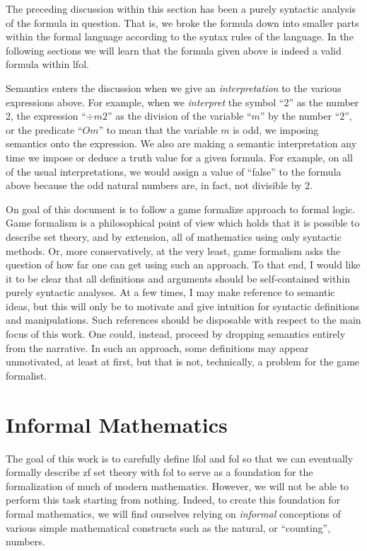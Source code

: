 \documentclass[12pt]{article}
\theoremstyle{break}
\theoremstyle{break}
\theoremstyle{break}
\theoremstyle{break}
\theoremstyle{break}
\newtheorem{informal definition}[definition]{Informal Definition}
\theoremstyle{break}
\newtheorem{informal theorem}[theorem]{Informal Theorem}
\newcommand{\qq}[1]{``#1''}
\begin{document}
	The preceding discussion within this section has been a purely syntactic analysis of the formula in question.
	That is, we broke the formula down into smaller parts within the formal language according to the syntax rules of the language.
	In the following sections we will learn that the formula given above is indeed a valid formula within \gls{lfol}.
	
	Semantics enters the discussion when we give an \textit{interpretation} to the various expressions above.
	For example, when we \textit{interpret} the symbol \qq{2} as the number 2, the expression \qq{$\div m 2$} as the division of the variable \qq{$m$} by the number \qq{2}, or the predicate \qq{$Om$} to mean that the variable $m$ is odd, we imposing semantics onto the expression.
	We also are making a semantic interpretation any time we impose or deduce a truth value for a given formula.
	For example, on all of the usual interpretations, we would assign a value of \qq{false} to the formula above because the odd natural numbers are, in fact, not divisible by 2.
	
	On goal of this document is to follow a game formalize approach to formal logic.
	Game formalism is a philosophical point of view which holds that it is possible to describe set theory, and by extension, all of mathematics using only syntactic methods.
	Or, more conservatively, at the very least, game formalism asks the question of how far one can get using such an approach.
	To that end, I would like it to be clear that all definitions and arguments should be self-contained within purely syntactic analyses.
	At a few times, I may make reference to semantic ideas, but this will only be to motivate and give intuition for syntactic definitions and manipulations.
	Such references should be disposable with respect to the main focus of this work.
	One could, instead, proceed by dropping semantics entirely from the narrative.
	In such an approach, some definitions may appear unmotivated, at least at first, but that is not, technically, a problem for the game formalist.
	
	
	\section{Informal Mathematics}
	
	The goal of this work is to carefully define \gls{lfol} and \gls{fol} so that we can eventually formally describe \gls{zf} set theory with \gls{fol} to serve as a foundation for the formalization of much of modern mathematics.
	However, we will not be able to perform this task starting from nothing.
	Indeed, to create this foundation for formal mathematics, we will find ourselves relying on \textit{informal} conceptions of various simple mathematical constructs such as the natural, or \qq{counting}, numbers.
	
\end{document}
